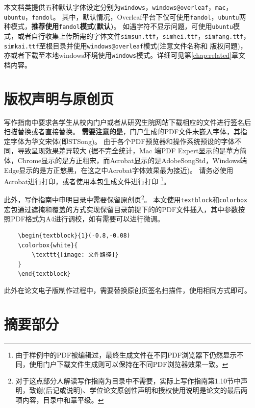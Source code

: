 本文档类提供五种默认字体设定分别为\verb|windows|，\verb|windows@overleaf|，\verb|mac|，\verb|ubuntu|，\verb|fandol|。
其中，默认情况，Overleaf平台下仅可使用\verb|fandol|，\verb|ubuntu|两种模式，\textbf{推荐使用}\verb|fandol|\textbf{模式(默认)}。
如遇字符不显示问题，可使用\verb|ubuntu|模式，或者自行收集上传所需的字体文件\verb|simsun.ttf|，\verb|simhei.ttf|，\verb|simfang.ttf|，\verb|simkai.ttf|至根目录并使用\verb|windows@overleaf|模式(注意文件名称和 版权问题)，亦或者下载至本地windows环境使用\verb|windows|模式。详细可见第\ref{chap:related}章文档内容。

\section{版权声明与原创页}
\label{sec:copy-origin}

写作指南中要求各学生从校内门户或者从研究生院网站下载相应的文件进行签名后扫描替换或者直接替换。
\textbf{需要注意的是}，门户生成的PDF文件未嵌入字体，其指定字体为华文宋体(即STSong)。
由于各个PDF预览器和操作系统预设的字体不同，导致呈现效果差异较大
(据不完全统计，Mac 端PDF Expert显示的是苹方简体，Chrome显示的是方正粗宋，而Acrobat显示的是AdobeSongStd，Windows端Edge显示的是方正悠黑，在这之中Acrobat字体效果最为接近)。
请务必使用Acrobat进行打印，或者使用本包生成文件进行打印
\footnote{由于样例中的PDF被编辑过，最终生成文件在不同PDF浏览器下仍然显示不同，使用门户下载文件生成则可以保持在不同PDF浏览器效果一致。}。

此外，写作指南中申明目录中需要保留原创页\footnote{对于这点部分人解读写作指南为目录中不需要，实际上写作指南第1.10节中声明，致谢(后记或说明)、学位论文原创性声明和授权使用说明是论文的最后两项内容，目录中和章平级。}。
本文使用\verb|textblock|和\verb|colorbox|宏包通过遮掩和覆盖的方式实现保留目录前提下的的PDF文件插入，其中参数按照PDF格式为A4进行调校，如有需要可以进行微调。

\begin{Verbatim}
    \begin{textblock}{1}(-0.8,-0.08)
    \colorbox{white}{
        \texttt{[image: 文件路径]}
    }
    \end{textblock}
\end{Verbatim}

此外在论文电子版制作过程中，需要替换原创页签名扫描件，使用相同方式即可。

\section{摘要部分}
\label{sec:abstract}

